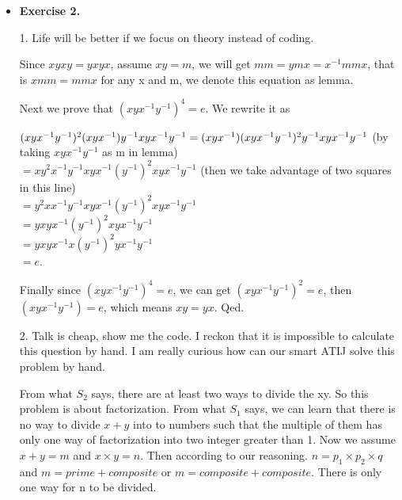 \documentclass{article}
\newcommand{\bigO}{\mathcal{O}}
\begin{document}
\begin{itemize}
(c) Similar to part 1, for the recursion, we have $T (n) = 2T (n/2) + 2D(n)$, where $D(n)$ is  $\bigO(n\log n)$. Using master theorem, we can get the complexity of $T(n) = \bigO(n\log n^2) = \bigO(M(n)\log n)$. SO it can be solved within $\bigO(M(n)\log n)$ operations.

5. I do not think so, since it will require $\bigO(n^2)$ polynomial space complexity, which is really costly when more points are chosen for fitting. Space is more expensive than time. However, we can do pre-calculation when the size is small to save time. 

\item \textbf{Exercise 2.}

1. Life will be better if we focus on theory instead of coding.

Since $xyxy = yxyx$, assume $xy = m$, we will get $mm = ymx = x^{-1}mmx$, that is $xmm = mmx$ for any x and m, we denote this equation as lemma.

Next we prove that $(xyx^{-1}y^{-1})^4 = e$. We rewrite it as 

$(xyx^{-1}y^{-1})^2 (xyx^{-1})y^{-1} xyx^{-1}y^{-1} \\= (xyx^{-1}) (xyx^{-1}y^{-1})^2 y^{-1} xyx^{-1}y^{-1}$ (by taking $xyx^{-1}y^{-1}$ as m in lemma) \\$= xy^2x^{-1}y^{-1}xyx^{-1}(y^{-1})^2xyx^{-1}y^{-1}$ (then we take advantage of two squares in this line) \\$= y^2xx^{-1}y^{-1}xyx^{-1}(y^{-1})^2xyx^{-1}y^{-1}$ \\$= yxyx^{-1}(y^{-1})^{2} x y x^{-1} y^{-1}$ \\$ = yxyx^{-1}x(y^{-1})^{2} y x^{-1} y^{-1}$\\$ = e$.

Finally since $(xyx^{-1}y^{-1})^4 = e$, we can get $(xyx^{-1}y^{-1})^2 = e$, then $(xyx^{-1}y^{-1}) = e$, which means $xy = yx$. Qed.

2. Talk is cheap, show me the code. I reckon that it is impossible to calculate this question by hand. I am really curious how can our smart ATIJ solve this problem by hand.

From what $S_2$ says, there are at least two ways to divide the xy. So this problem is about factorization. From what $S_1$ says, we can learn that there is no way to divide $x+y$ into to numbers such that the multiple of them has only one way of factorization into two integer greater than 1. Now we assume $x + y = m$ and $x\times y = n$. Then according to our reasoning. $n = p_1\times p_2\times q$ and $m = prime + composite$ or $m = composite + composite$. There is only one way for n to be divided.


\end{itemize}
\end{document}
